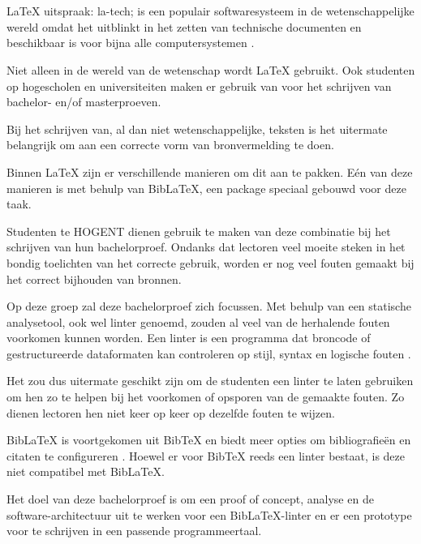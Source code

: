 
\chapter{}%
\label{ch:inleiding}
\LaTeX{} uitspraak: la-tech; is een populair softwaresysteem in de wetenschappelijke wereld omdat het uitblinkt in het zetten van technische documenten
en beschikbaar is voor bijna alle computersystemen \autocite{Oetiker2023}.

Niet alleen in de wereld van de wetenschap wordt \LaTeX{} gebruikt. Ook studenten op hogescholen en universiteiten maken er gebruik van voor het schrijven van bachelor- en/of masterproeven.

Bij het schrijven van, al dan niet wetenschappelijke, teksten is het uitermate belangrijk om aan een correcte vorm van bronvermelding te doen.

Binnen \LaTeX{} zijn er verschillende manieren om dit aan te pakken. Eén van deze manieren is met behulp van BibLaTeX, een package speciaal gebouwd voor deze taak.

Studenten te HOGENT dienen gebruik te maken van deze combinatie bij het schrijven van hun bachelorproef. Ondanks dat lectoren veel moeite steken in het bondig toelichten van het correcte gebruik, worden er nog veel fouten gemaakt bij het correct bijhouden van bronnen. 

Op deze groep zal deze bachelorproef zich focussen. Met behulp van een statische analysetool, ook wel linter genoemd, zouden al veel van de herhalende fouten voorkomen kunnen worden. Een linter is een programma dat broncode of gestructureerde dataformaten kan controleren op stijl, syntax en logische fouten \autocite{Kamunya2023}.

Het zou dus uitermate geschikt zijn om de studenten een linter te laten gebruiken om hen zo te helpen bij het voorkomen of opsporen van de gemaakte fouten. Zo dienen lectoren hen niet keer op keer op dezelfde fouten te wijzen.

BibLaTeX is voortgekomen uit BibTeX en biedt meer opties om bibliografieën en citaten te configureren \autocite{Cassidy2013}. Hoewel er voor BibTeX reeds een linter bestaat, is deze niet compatibel met BibLaTeX.

Het doel van deze bachelorproef is om een proof of concept, analyse en de software-architectuur uit te werken voor een BibLaTeX-linter en er een prototype voor te schrijven in een passende programmeertaal. 

